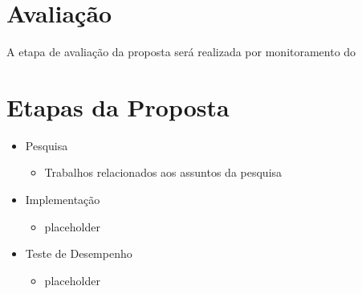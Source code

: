 \documentclass[a4paper, 11pt]{article}
\begin{document}
\section{Avalia\c{c}\~{a}o}
A etapa de avalia\c{c}\~{a}o da proposta ser\'a realizada por monitoramento do 

\section{Etapas da Proposta}
\begin{itemize}
 \item Pesquisa
  \begin{itemize}
  \item Trabalhos relacionados aos assuntos da pesquisa
  \end{itemize}
 \item Implementa\c{c}\~{a}o
  \begin{itemize}
    \item placeholder
  \end{itemize}
 \item Teste de Desempenho 
  \begin{itemize}
    \item placeholder
  \end{itemize}
\end{itemize}


\newpage


\end{document}
